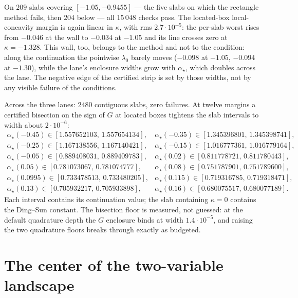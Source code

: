 \documentclass[11pt]{article}
\theoremstyle{remark}
\begin{document}
On $209$ slabs covering $[-1.05,-0.9455]$ --- the five slabs on
which the rectangle method fails, then $204$ below --- all
$15\,048$ checks pass.  The located-box local-concavity margin is again linear in
$\kappa$, with rms $2.7\cdot10^{-5}$: the per-slab worst rises from
$-0.046$ at the wall to $-0.034$ at $-1.05$ and its line crosses
zero at $\kappa=-1.328$.  This wall, too, belongs to the method and
not to the condition: along the continuation the pointwise
$\lambda_0$ barely moves ($-0.098$ at $-1.05$, $-0.094$ at $-1.30$),
while the lane's enclosure widths grow with $\alpha_\star$, which
doubles across the lane.  The negative edge of the certified strip
is set by those widths, not by any visible failure of the
conditions.

Across the three lanes: $2480$ contiguous slabs, zero failures.  At twelve
margins a certified bisection on the sign of $G$ at located boxes
tightens the slab intervals to width about $2\cdot10^{-6}$:
\[
\begin{array}{ll}
\alpha_\star(-0.45)\in[1.557652103,\,1.557654134], &
\alpha_\star(-0.35)\in[1.345396801,\,1.345398741],\\
\alpha_\star(-0.25)\in[1.167138556,\,1.167140421], &
\alpha_\star(-0.15)\in[1.016777361,\,1.016779164],\\
\alpha_\star(-0.05)\in[0.889408031,\,0.889409783], &
\alpha_\star(0.02)\in[0.811778721,\,0.811780443],\\
\alpha_\star(0.05)\in[0.781073067,\,0.781074777], &
\alpha_\star(0.08)\in[0.751787901,\,0.751789600],\\
\alpha_\star(0.0995)\in[0.733478513,\,0.733480205], &
\alpha_\star(0.115)\in[0.719316785,\,0.719318471],\\
\alpha_\star(0.13)\in[0.705932217,\,0.705933898], &
\alpha_\star(0.16)\in[0.680075517,\,0.680077189].
\end{array}
\]
Each interval contains its continuation value; the slab containing
$\kappa=0$ contains the Ding--Sun constant.  The bisection floor is
measured, not guessed: at the default quadrature depth the $G$
enclosure binds at width $1.4\cdot10^{-5}$, and raising the two
quadrature floors breaks through exactly as budgeted.

\section{The center of the two-variable landscape}\label{sec:hessian}
\end{document}

